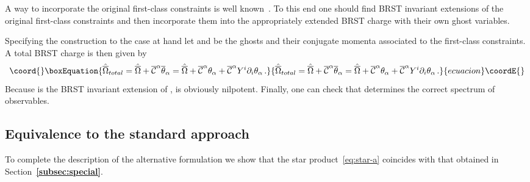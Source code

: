 \documentclass[a4paper,11pt]{amsart}
\numberwithin{thm}{section} %
\numberwithin{equation}{section} %
\numberwithin{figure}{section} %
\providecommand{\bref}[1]{{\bf \ref{#1}}}
\renewcommand{\:}{{\rm\, :\,}}
\def\bar{\overline}
\def\d{\partial}
\def\cP{{\mathcal P}}
\def\cc{{\mathcal C}}
\begin{document}
A way to incorporate the original first-class constraints is well
known~\cite{[BFF],[BT]}. To this end one should find
BRST invariant extensions of the original first-class
constraints and then incorporate them into the appropriately
extended BRST charge with their own ghost variables.

Specifying the construction to the case at hand let \myHighlight{${\bar\cc}^\alpha$}\coordHE{}
and \myHighlight{${\bar\cP}_\alpha$}\coordHE{} be the ghosts and their conjugate momenta
associated to the first-class constraints.
A total BRST charge \myHighlight{${\hat{\bar\Omega}}_{total}$}\coordHE{}
is then given by
\begin{equation}\coord{}\boxEquation{
  {\hat{\bar\Omega}}_{total}={\hat{\bar\Omega}}+{\bar\cc}^\alpha{\bar\theta}_\alpha=
{\hat{\bar\Omega}}+{\bar\cc}^\alpha{\theta}_\alpha
+{\bar\cc}^\alpha Y^i\d_i\theta_\alpha\,.
}{
  {\hat{\bar\Omega}}_{total}={\hat{\bar\Omega}}+{\bar\cc}^\alpha{\bar\theta}_\alpha=
{\hat{\bar\Omega}}+{\bar\cc}^\alpha{\theta}_\alpha
+{\bar\cc}^\alpha Y^i\d_i\theta_\alpha\,.
}{ecuacion}\coordE{}\end{equation}
Because \myHighlight{$\bar\theta_\alpha$}\coordHE{} is the BRST invariant extension of
\myHighlight{$\theta_\alpha$}\coordHE{}, \myHighlight{${\hat{\bar\Omega}}_{total}$}\coordHE{} is obviously nilpotent.
Finally, one can check that \myHighlight{${\hat{\bar\Omega}}_{total}$}\coordHE{} determines
the correct spectrum of observables.

\subsection{Equivalence to the standard approach}
To complete the description of the alternative formulation we show
that the star product~\eqref{eq:star-a} coincides with that
obtained in Section~\bref{subsec:special}.
\end{document}
